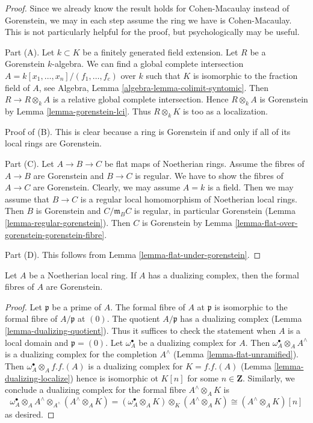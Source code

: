 \begin{proof}
Since we already know the result holds for Cohen-Macaulay instead
of Gorenstein, we may in each step assume the ring we have is
Cohen-Macaulay. This is not particularly helpful for the proof, but
psychologically may be useful.

\medskip\noindent
Part (A). Let $k \subset K$ be a finitely generated field extension.
Let $R$ be a Gorenstein $k$-algebra.
We can find a global complete intersection
$A = k[x_1, \ldots, x_n]/(f_1, \ldots, f_c)$
over $k$ such that $K$ is isomorphic to the fraction field of $A$, see
Algebra, Lemma \ref{algebra-lemma-colimit-syntomic}.
Then $R \to R \otimes_k A$ is a relative global complete intersection.
Hence $R \otimes_k A$ is Gorenstein by Lemma \ref{lemma-gorenstein-lci}.
Thus $R \otimes_k K$ is too as a localization.

\medskip\noindent
Proof of (B). This is clear because a ring is Gorenstein
if and only if all of its local rings are Gorenstein.

\medskip\noindent
Part (C). Let $A \to B \to C$ be flat maps of Noetherian rings.
Assume the fibres of $A \to B$ are Gorenstein and $B \to C$ is regular.
We have to show the fibres of $A \to C$ are Gorenstein.
Clearly, we may assume $A = k$ is a field. Then we may assume that
$B \to C$ is a regular local homomorphism of Noetherian local rings.
Then $B$ is Gorenstein and $C/\mathfrak m_B C$ is regular, in
particular Gorenstein (Lemma \ref{lemma-regular-gorenstein}).
Then $C$ is Gorenstein by
Lemma \ref{lemma-flat-over-gorenstein-gorenstein-fibre}.

\medskip\noindent
Part (D). This follows from Lemma \ref{lemma-flat-under-gorenstein}.
\end{proof}

\begin{lemma}
\label{lemma-dualizing-gorenstein-formal-fibres}
Let $A$ be a Noetherian local ring. If $A$ has a dualizing complex,
then the formal fibres of $A$ are Gorenstein.
\end{lemma}

\begin{proof}
Let $\mathfrak p$ be a prime of $A$. The formal fibre of $A$ at $\mathfrak p$
is isomorphic to the formal fibre of $A/\mathfrak p$ at $(0)$. The quotient
$A/\mathfrak p$ has a dualizing complex
(Lemma \ref{lemma-dualizing-quotient}). Thus it suffices to check the statement
when $A$ is a local domain and $\mathfrak p = (0)$.
Let $\omega_A^\bullet$ be a dualizing complex for $A$. Then
$\omega_A^\bullet \otimes_A A^\wedge$ is a dualizing complex
for the completion $A^\wedge$ (Lemma \ref{lemma-flat-unramified}).
Then $\omega_A^\bullet \otimes_A f.f.(A)$ is a dualizing
complex for $K = f.f.(A)$ (Lemma \ref{lemma-dualizing-localize})
hence is isomorphic ot $K[n]$ for some $n \in \mathbf{Z}$.
Similarly, we conclude a dualizing complex for the formal fibre
$A^\wedge \otimes_A K$ is
$$
\omega_A^\bullet \otimes_A A^\wedge \otimes_{A^\wedge} (A^\wedge \otimes_A K) =
(\omega_A^\bullet \otimes_A K) \otimes_K (A^\wedge \otimes_A K) \cong
(A^\wedge \otimes_A K)[n]
$$
as desired.
\end{proof}

